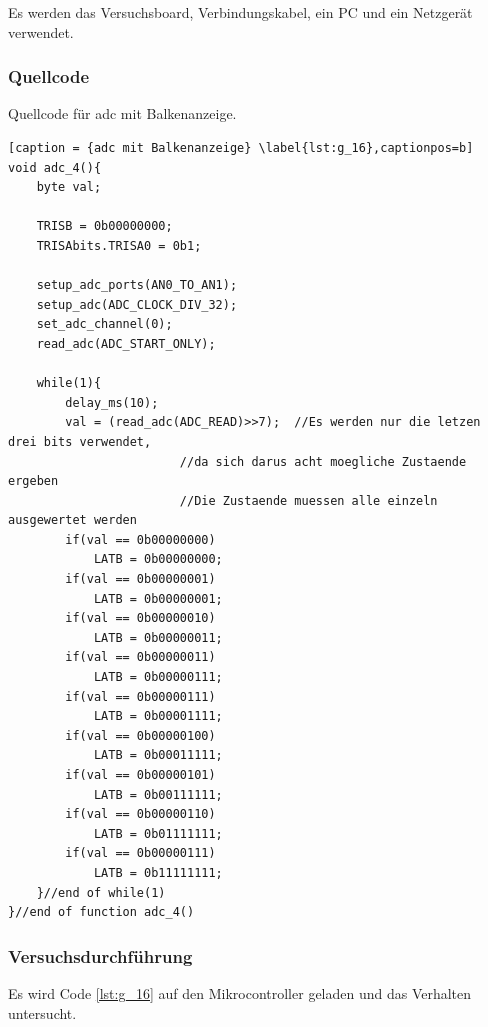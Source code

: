 \documentclass[12pt,a4paper]{article}
\begin{document}
Es werden das Versuchsboard, Verbindungskabel, ein PC und ein Netzgerät verwendet.

\subsubsection*{Quellcode}

Quellcode für adc mit Balkenanzeige.

\lstset{language=C, basicstyle=\tiny}
\begin{lstlisting}[caption = {adc mit Balkenanzeige} \label{lst:g_16},captionpos=b]
void adc_4(){
	byte val;
	
	TRISB = 0b00000000;
	TRISAbits.TRISA0 = 0b1;
	
	setup_adc_ports(AN0_TO_AN1);
	setup_adc(ADC_CLOCK_DIV_32);
	set_adc_channel(0);
	read_adc(ADC_START_ONLY);
	
	while(1){
		delay_ms(10);
		val = (read_adc(ADC_READ)>>7);	//Es werden nur die letzen drei bits verwendet,
						//da sich darus acht moegliche Zustaende ergeben
						//Die Zustaende muessen alle einzeln ausgewertet werden
		if(val == 0b00000000)
			LATB = 0b00000000;		
		if(val == 0b00000001)
			LATB = 0b00000001;
		if(val == 0b00000010)
			LATB = 0b00000011;
		if(val == 0b00000011)
			LATB = 0b00000111;		
		if(val == 0b00000111)
			LATB = 0b00001111;
		if(val == 0b00000100)
			LATB = 0b00011111;
		if(val == 0b00000101)
			LATB = 0b00111111;
		if(val == 0b00000110)
			LATB = 0b01111111;		
		if(val == 0b00000111)
			LATB = 0b11111111;					
	}//end of while(1)
}//end of function adc_4()
\end{lstlisting}

\subsubsection*{Versuchsdurchführung}

Es wird Code \ref{lst:g_16} auf den Mikrocontroller geladen und das Verhalten untersucht.
\end{document}
